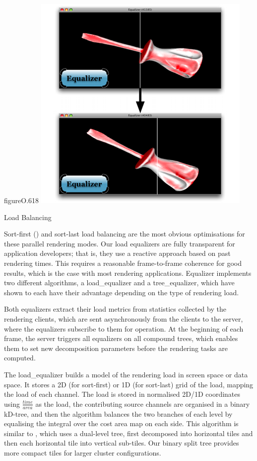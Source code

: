\begin{wrapfloat}{figure}{O}{.618\textwidth}
  \includegraphics[width=.618\textwidth]{images/loadeq}
  \caption{\label{floadeq}Load Balancing}
\end{wrapfloat}

Sort-first () and sort-last load balancing are the most obvious
optimisations for these parallel rendering modes. Our load equalizers are fully
transparent for application developers; that is, they use a reactive approach
based on past rendering times. This requires a reasonable frame-to-frame
coherence for good results, which is the case with most rendering applications.
Equalizer implements two different algorithms, a \textsf{load\_equalizer} and a
\textsf{tree\_equalizer}, which have shown to each have their advantage
depending on the type of rendering load.

Both equalizers extract their load metrics from statistics collected by the
rendering clients, which are sent asynchronously from the clients to the
server, where the equalizers subscribe to them for operation. At the beginning
of each frame, the server triggers all equalizers on all compound trees, which
enables them to set new decomposition parameters before the rendering tasks are
computed.

The \textsf{load\_equalizer} builds a model of the rendering load in screen
space or data space. It stores a 2D (for sort-first) or 1D (for sort-last) grid
of the load, mapping the load of each channel. The load is stored in normalised
2D/1D coordinates using $\frac{time}{area}$ as the load, the contributing source
channels are organised in a binary kD-tree, and then the algorithm balances the
two branches of each level by equalising the integral over the cost area map on
each side. This algorithm is similar to \cite{ACCC:04}, which uses a dual-level
tree, first decomposed into horizontal tiles and then each horizontal tile into
vertical sub-tiles. Our binary split tree provides more compact tiles for larger
cluster configurations.

